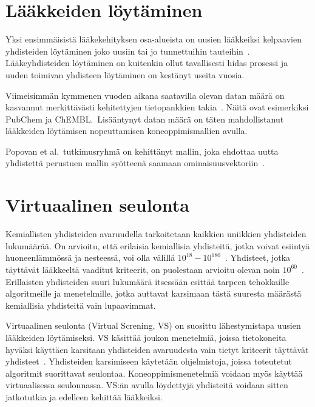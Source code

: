\documentclass[finnish,twoside,censored,tkt,sw-line]{HYthesisML}
\begin{document}
\section{Lääkkeiden löytäminen}

Yksi ensimmäisistä lääkekehityksen osa-alueista on uusien lääkkeiksi kelpaavien yhdisteiden löytäminen joko uusiin tai jo tunnettuihin tauteihin~\cite{EkinsSean2019Emlf}.
Lääkeyhdisteiden löytäminen on kuitenkin ollut tavallisesti hidas prosessi ja uuden toimivan yhdisteen löytäminen on kestänyt useita vuosia.

Viimeisimmän kymmenen vuoden aikana saatavilla olevan datan määrä on kasvannut merkittävästi kehitettyjen tietopankkien takia~\cite{EkinsSean2019Emlf}.
Näitä ovat esimerkiksi PubChem ja ChEMBL.\
Lisääntynyt datan määrä on täten mahdollistanut lääkkeiden löytämisen nopeuttamisen koneoppimismallien avulla.

Popovan et al.\ tutkimusryhmä on kehittänyt mallin, joka ehdottaa uutta yhdistettä perustuen mallin syötteenä saamaan ominaisuusvektoriin~\cite{PopovaMariya2018Drlf}.

\section{Virtuaalinen seulonta}

Kemiallisten yhdisteiden avaruudella tarkoitetaan kaikkien uniikkien yhdisteiden lukumäärää.
On arvioitu, että erilaisia kemiallisia yhdisteitä, jotka voivat esiintyä huoneenlämmössä ja nesteessä, voi olla välillä \(10^{18} - 10^{180}\)~\cite{SotrifferChristoph2011VSPC}.
Yhdisteet, jotka täyttävät lääkkeeltä vaaditut kriteerit, on puolestaan arvioitu olevan noin \(10^{60}\)~\cite{SotrifferChristoph2011VSPC}.
Erillaisten yhdisteiden suuri lukumäärä itsessään esittää tarpeen tehokkaille algoritmeille ja menetelmille, jotka auttavat karsimaan tästä suuresta määrästä kemiallisia yhdisteitä vain lupaavimmat.

Virtuaalinen seulonta (Virtual Screning, VS) on suosittu lähestymistapa uusien lääkkeiden löytämiseksi.
VS käsittää joukon menetelmiä, joissa tietokoneita hyväksi käyttäen karsitaan yhdisteiden avaruudesta vain tietyt kriteerit täyttävät yhdisteet~\cite{SotrifferChristoph2011VSPC}.
Yhdisteiden karsimiseen käytetään ohjelmistoja, joissa toteutetut algoritmit suorittavat seulontaa.
Koneoppimismenetelmiä voidaan myös käyttää virtuaalisessa seulonnassa.
VS:än avulla löydettyjä yhdisteitä voidaan sitten jatkotutkia ja edelleen kehittää lääkkeiksi.
\end{document}
